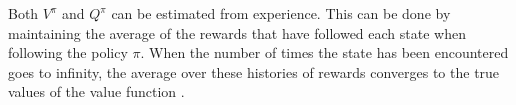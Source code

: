 Both $V^\pi$ and $Q^\pi$ can be estimated from experience. This can be done by
maintaining the average of the rewards that have followed each state when
following the policy $\pi$. When the number of times the state has been
encountered goes to infinity, the average over these histories of rewards
converges to the true values of the value function
\parencite{barto1998reinforcement}.





